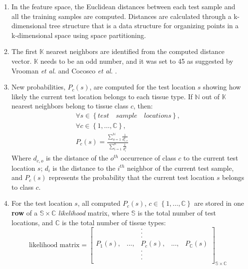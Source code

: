 \begin{enumerate}
\item In the feature space, the Euclidean distances between each test sample and all the training samples are computed.
Distances are calculated through a k-dimensional tree structure \cite{Bentley75} that is a data structure for organizing points in a k-dimensional space using space partitioning.

\item The first $\mathbb{K}$ nearest neighbors are identified from the computed distance vector. $\mathbb{K}$ needs to be an odd number, and it was set to 45 as suggested by Vrooman \emph{et al.} \cite{Vrooman2007} and Cocosco \emph{et al.} \cite{Cocosco2003}.

\item
New probabilities, $P_c(s)$, are computed for the test location $s$ showing how likely the current test location belongs to each tissue type.
If $\mathbb{N}$ out of $\mathbb{K}$ nearest neighbors belong to tissue class $c$, then:
\begin{equation}
\begin{gathered}
\forall s\in \left\{test \quad sample \quad locations\right\}, \\
\forall c\in \left\{1,\ldots, \mathbb{C}\right\}, \\
P_c(s) = \frac{ \sum_{o=1}^{\mathbb{N}} \frac{1}{d_{c,o}^2} }{ \sum_{i=1}^{\mathbb{K}} \frac{1}{d_{i}^2} }
\end{gathered}
\end{equation}
Where $d_{c,o}$ is the distance of the $o^{th}$ occurrence of class $c$ to the current test location $s$; $d_{i}$ is the distance to the $i^{th}$ neighbor of the current test sample, and $P_c(s)$ represents the probability that the current test location $s$ belongs to class $c$.

\item For the test location $s$, all computed $P_c(s)$, $c\in \left\{1,\ldots, \mathbb{C}\right\}$ are stored in one \textbf{row} of a $\mathbb{S}\times \mathbb{C}$ \textit{likelihood} matrix, where $\mathbb{S}$ is the total number of test locations, and $\mathbb{C}$ is the total number of tissue types:
\begin{equation}
\textrm{likelihood matrix} =
\begin{bmatrix}
 & & . \\
 & & . \\
 & & . \\
P_1(s), & ..., & P_c(s), & ..., & P_{\mathbb{C}}(s) \\
 & & . \\
 & & . \\
 & & . \\
\end{bmatrix}_{\mathbb{S}\times \mathbb{C}}
\end{equation}


\end{enumerate}
